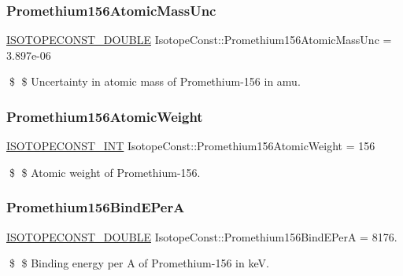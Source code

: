 \subsubsection{\texorpdfstring{Promethium156\+Atomic\+Mass\+Unc}{Promethium156AtomicMassUnc}}
{\footnotesize\ttfamily \mbox{\hyperlink{group___isotope_const-_macros_ga8f45a7272ce02c0b4c65c44636ed719a}{I\+S\+O\+T\+O\+P\+E\+C\+O\+N\+S\+T\+\_\+\+D\+O\+U\+B\+LE}} Isotope\+Const\+::\+Promethium156\+Atomic\+Mass\+Unc = 3.\+897e-\/06}

\$ \$ Uncertainty in atomic mass of Promethium-\/156 in amu. \mbox{\label{group___isotope_const-_promethium-_pm156_ga9fdeddc5bca7564ae4f8948dbfd4941b}} 
\subsubsection{\texorpdfstring{Promethium156\+Atomic\+Weight}{Promethium156AtomicWeight}}
{\footnotesize\ttfamily \mbox{\hyperlink{group___isotope_const-_macros_ga5f18360b3e99483a35c32d789e62621c}{I\+S\+O\+T\+O\+P\+E\+C\+O\+N\+S\+T\+\_\+\+I\+NT}} Isotope\+Const\+::\+Promethium156\+Atomic\+Weight = 156}

\$ \$ Atomic weight of Promethium-\/156. \mbox{\label{group___isotope_const-_promethium-_pm156_ga41e0232621e4ccaa34279e6ffd02783c}} 
\subsubsection{\texorpdfstring{Promethium156\+Bind\+E\+PerA}{Promethium156BindEPerA}}
{\footnotesize\ttfamily \mbox{\hyperlink{group___isotope_const-_macros_ga8f45a7272ce02c0b4c65c44636ed719a}{I\+S\+O\+T\+O\+P\+E\+C\+O\+N\+S\+T\+\_\+\+D\+O\+U\+B\+LE}} Isotope\+Const\+::\+Promethium156\+Bind\+E\+PerA = 8176.}

\$ \$ Binding energy per A of Promethium-\/156 in keV. \mbox{\label{group___isotope_const-_promethium-_pm156_gaa662312ebafd003e76d9aaf44dad3e5c}} 
